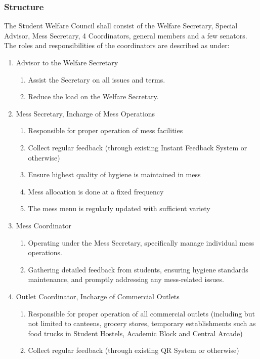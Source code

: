 \documentclass[12pt]{article}
\begin{document}
\subsubsection{Structure}
The Student Welfare Council shall consist of the Welfare Secretary, Special Advisor, Mess Secretary, 4 Coordinators, general members and a few senators. The roles and responsibilities of the coordinators are described as under:
\begin{enumerate}
    \item Advisor to the Welfare Secretary
    \begin{enumerate}
        \item Assist the Secretary on all issues and terms.
        \item Reduce the load on the Welfare Secretary.
    \end{enumerate}
    \item Mess Secretary, Incharge of Mess Operations
    \begin{enumerate}
        \item Responsible for proper operation of mess facilities
        \item Collect regular feedback (through existing Instant Feedback System or otherwise)
        \item Ensure highest quality of hygiene is maintained in mess
        \item Mess allocation is done at a fixed frequency
        \item The mess menu is regularly updated with sufficient variety
    \end{enumerate}
    \item Mess Coordinator
    \begin{enumerate}
        \item Operating under the Mess Secretary, specifically manage individual mess operations.
        \item Gathering detailed feedback from students, ensuring hygiene standards maintenance, and promptly addressing any mess-related issues.
    \end{enumerate}
    \item Outlet Coordinator, Incharge of Commercial Outlets
    \begin{enumerate}
        \item Responsible for proper operation of all commercial outlets (including but not limited to canteens, grocery stores, temporary establishments such as food trucks in Student Hostels, Academic Block and Central Arcade)
        \item Collect regular feedback (through existing QR System or otherwise)

\end{enumerate}
\end{enumerate}
\end{document}
